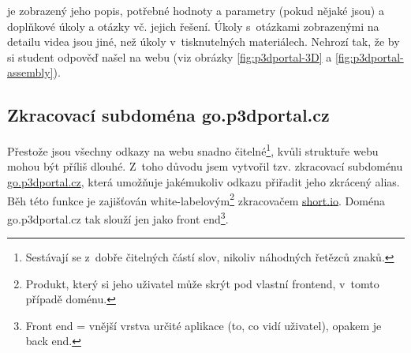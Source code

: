 \noindent{} je zobrazený jeho popis, potřebné hodnoty a parametry (pokud nějaké jsou) a doplňkové úkoly a otázky vč. jejich řešení. Úkoly s~otázkami zobrazenými na detailu videa jsou jiné, než úkoly v~tisknutelných materiálech. Nehrozí tak, že by si student odpověď našel na webu (viz obrázky \ref{fig:p3dportal-3D} a \ref{fig:p3dportal-assembly}).

\subsection{Zkracovací subdoména go.p3dportal.cz}
Přestože jsou všechny odkazy na webu snadno čitelné\footnote{Sestávají se z~dobře čitelných částí slov, nikoliv náhodných řetězců znaků.}, kvůli struktuře webu mohou být příliš dlouhé.
Z~toho důvodu jsem vytvořil tzv. zkracovací subdoménu \href{https://go.p3dportal.cz}{go.p3dportal.cz}, která umožňuje jakémukoliv odkazu přiřadit jeho zkrácený alias.
Běh této funkce je zajišťován white-labelovým\footnote{Produkt, který si jeho uživatel může skrýt pod vlastní frontend, v~tomto případě doménu.} zkracovačem \href{https://short.io}{short.io}.
Doména go.p3dportal.cz tak slouží jen jako front end\footnote{Front end = vnější vrstva určité aplikace (to, co vidí uživatel), opakem je back end.}.

